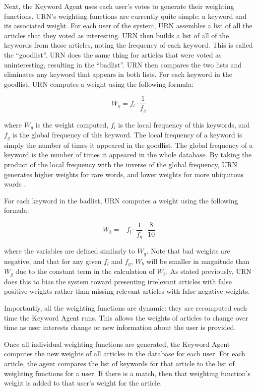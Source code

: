 Next, the Keyword Agent uses each user's votes to generate their weighting
functions. URN's weighting functions are currently quite simple: a keyword
and its associated weight. For each user of the system, URN assembles a
list of all the articles that they voted as interesting.  URN then builds a
list of all of the keywords from those articles, noting the frequency of
each keyword. This is called the ``goodlist''.  URN does the same thing for
articles that were voted as uninteresting, resulting in the ``badlist''.
URN then compares the two lists and eliminates any keyword that appears in
both lists.  For each keyword in the goodlist, URN computes a weight using
the following formula:

\begin{displaymath}
W_g = f_l \cdot \frac{1}{f_g}
\end{displaymath}

where $W_g$ is the weight computed, $f_l$ is the local frequency of this
keywords, and $f_g$ is the global frequency of this keyword. The local
frequency of a keyword is simply the number of times it appeared in the
goodlist. The global frequency of a keyword is the number of times it appeared
in the whole database. By taking the product of the local frequency with the
inverse of the global frequency, URN generates higher weights for rare
words, and lower weights for more ubiquitous words
\cite{cacm-infofiltering-92}.

For each keyword in the badlist, URN computes a weight using the following
formula:

\begin{displaymath}
W_b = - f_l \cdot \frac{1}{f_g} \cdot \frac{8}{10}
\end{displaymath}

where the variables are defined similarly to $W_g$. Note that bad weights
are negative, and that for any given $f_l$ and $f_g$, $W_b$ will be smaller
in magnitude than $W_g$ due to the constant term in the calculation of
$W_b$.  As stated previously, URN does this to bias the system toward
presenting irrelevant articles with false positive weights rather than
missing relevant articles with false negative weights.

Importantly, all the weighting functions are dynamic: they are recomputed
each time the Keyword Agent runs. This allows the weights of articles to
change over time as user interests change or new information about the user
is provided.

Once all individual weighting functions are generated, the Keyword Agent
computes the new weights of all articles in the database for each user. For
each article, the agent compares the list of keywords for that article to
the list of weighting functions for a user. If there is a match, then that
weighting function's weight is added to that user's weight for the article.


